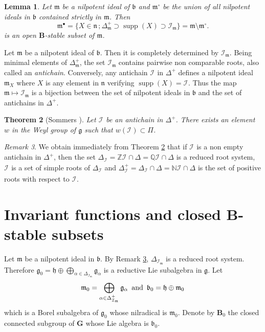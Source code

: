 \documentclass[10pt,a4paper]{amsart}
\newcommand{\highlight}[1]{{\it #1}}
\newcommand{\supp}{\mathop{\mathrm{supp}}\nolimits}
\newcommand{\soc}[1]{\mathcal{I}_{#1}}
\newcommand{\group}[1]{\mathbf{#1}}
\numberwithin{equation}{section}
\theoremstyle{plain}
\newtheorem{theorem}{Theorem}[section]
\newtheorem{lemma}[theorem]{Lemma}
\theoremstyle{definition}
\theoremstyle{remark}
\newtheorem{remark}[theorem]{Remark}
\begin{document}
\begin{lemma}\label{socle-ideal}
Let $\mathfrak{m}$ be a nilpotent ideal of $\mathfrak{b}$ and
$\mathfrak{m}^{\circ}$ be the union of all nilpotent ideals in $\mathfrak{b}$ 
contained strictly in $\mathfrak{m}$. Then
$$
\mathfrak{m}^{\bullet} = \{ X\in \mathfrak{n}\, ; \Delta_{\mathfrak{m}}^{+}\supset 
\supp( X) \supset \soc{\mathfrak{m}} \}
= \mathfrak{m} \setminus  \mathfrak{m}^{\circ}.
$$
is an open $\group{B}$-stable subset of $\mathfrak{m}$.
\end{lemma}

Let $\mathfrak{m}$ be a nilpotent ideal of $\mathfrak{b}$. Then it is completely determined
by $\soc{\mathfrak{m}}$. Being minimal elements of $\Delta_{\mathfrak{m}}^{+}$, 
the set $\soc{\mathfrak{m}}$ contains pairwise non comparable roots, also called an
\highlight{antichain}. Conversely, any antichain $\soc{}$ in $\Delta^{+}$ defines 
a nilpotent ideal $\mathfrak{m}_{X}$ where $X$ is any element in $\mathfrak{n}$ 
verifying $\supp (X) = \soc{}$. Thus the map $\mathfrak{m}\mapsto \soc{\mathfrak{m}}$ 
is a bijection between the set of nilpotent ideals in $\mathfrak{b}$ and the set of antichains
in $\Delta^{+}$.  

\begin{theorem}[Sommers \cite{So}]\label{antichain}
Let $\soc{}$ be an antichain in $\Delta^{+}$. There exists an element $w$ in the 
Weyl group of $\mathfrak{g}$ such that $w (\soc{} ) \subset \Pi$.
\end{theorem}

\begin{remark}\label{antichain-remark}
We obtain immediately from Theorem \ref{antichain} that if
$\soc{}$ is a non empty antichain in $\Delta^{+}$, then the set $\Delta_{\soc{}} = \mathbb{Z} \soc{} \cap \Delta =
\mathbb{Q} \soc{} \cap \Delta$ is a reduced root system, $\soc{}$ is a set of simple roots of $\Delta_{\soc{}}$
and $\Delta_{\soc{}}^{+} = \Delta_{\soc{}} \cap \Delta = \mathbb{N} \soc{} \cap \Delta$
is the set of positive roots with respect to $\soc{}$.
\end{remark}


\section{Invariant functions and closed $\group{B}$-stable subsets}\label{sec:uniqueness}

Let $\mathfrak{m}$ be a nilpotent ideal in $\mathfrak{b}$. 
By Remark \ref{antichain-remark}, $\Delta_{\soc{\mathfrak{m}}}$ is a reduced root system. Therefore
$
\mathfrak{g}_{0} = \mathfrak{h} \oplus \bigoplus_{\alpha\in \Delta_{\soc{\mathfrak{m}}}}
\mathfrak{g}_{\alpha}
$
is a reductive Lie subalgebra in $\mathfrak{g}$. Let 
$$
\mathfrak{m}_{0} = \bigoplus_{\alpha\in \Delta_{\soc{\mathfrak{m}}}^{+}}
\mathfrak{g}_{\alpha} \, \hbox{ and } \,
\mathfrak{b}_{0} = \mathfrak{h}\oplus \mathfrak{m}_{0}
$$
which is a Borel subalgebra of $\mathfrak{g}_{0}$ whose nilradical is 
$\mathfrak{m}_{0}$.
Denote by $\group{B}_{0}$ the closed connected subgroup of $\group{G}$ 
whose Lie algebra is $\mathfrak{b}_{0}$.
\end{document}

